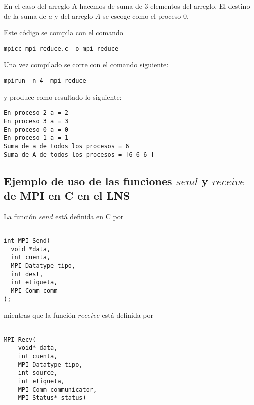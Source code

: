 \documentclass[letter]{jpconf}
\begin{document}
 En el caso del arreglo A hacemos de suma de 3 elementos del arreglo. El destino de la suma de $a$ y del arreglo $A$ se escoge como el proceso $0$.



Este c\'odigo se compila con el comando
\color{blue}
\begin{verbatim}
mpicc mpi-reduce.c -o mpi-reduce
\end{verbatim}
\color{black}
Una vez compilado se corre con el comando siguiente:\color{blue}
\begin{verbatim}
mpirun -n 4  mpi-reduce
\end{verbatim}
\color{black}
y produce como resultado lo siguiente:
\color{brown}
\begin{verbatim}
En proceso 2 a = 2 
En proceso 3 a = 3 
En proceso 0 a = 0 
En proceso 1 a = 1 
Suma de a de todos los procesos = 6 
Suma de A de todos los procesos = [6 6 6 ]
\end{verbatim}
\color{black}


\subsection{Ejemplo de uso de las funciones $send$ y $receive$ de MPI en C en el LNS}

La funci\'on $send$ est\'a definida en C por
\color{black}
\begin{verbatim}

int MPI_Send(
  void *data,
  int cuenta,
  MPI_Datatype tipo,
  int dest,
  int etiqueta,
  MPI_Comm comm
);
\end{verbatim}
\color{black}

mientras que la funci\'on $receive$ est\'a definida por
\color{black}
\begin{verbatim}

MPI_Recv(
    void* data,
    int cuenta,
    MPI_Datatype tipo,
    int source,
    int etiqueta,
    MPI_Comm communicator,
    MPI_Status* status)
\end{verbatim}
\color{black}
\end{document}
